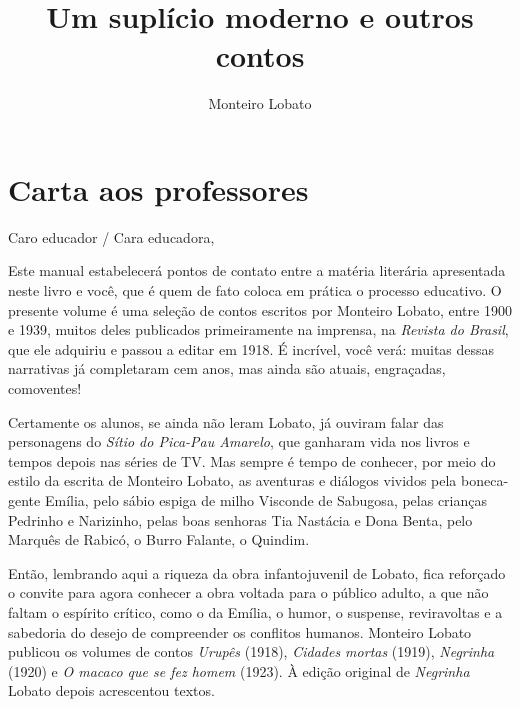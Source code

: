 \documentclass{article}
\begin{document}
\newcommand{\AutorLivro}{Monteiro Lobato}
\newcommand{\TituloLivro}{Um suplício moderno e outros contos}
\newcommand{\Tema}{Ficção, mistério e fantasia}
\newcommand{\Genero}{Conto, crônica e novela}
\newcommand{\issnppub}{---}
\newcommand{\issnepub}{---}
\newcommand{\colaborador}{\textbf{Fulano de Tal} é uma pessoa incrível e vai fazer um bom serviço.}


\title{\TituloLivro}
\author{\AutorLivro}
\def\authornotes{\colaborador}

\date{}
\maketitle
\tableofcontents

\pagebreak

\section{Carta aos professores}

Caro educador / Cara educadora,\\\bigskip

\reversemarginpar
\marginparwidth=5cm

Este manual estabelecerá pontos de contato entre a matéria literária
apresentada neste livro e você, que é quem de fato coloca em prática o
processo educativo. O presente volume é uma seleção de contos escritos
por Monteiro Lobato, entre 1900 e 1939, muitos deles publicados
primeiramente na imprensa, na \emph{Revista do Brasil}, que ele adquiriu
e passou a editar em 1918. É incrível, você verá: muitas dessas
narrativas já completaram cem anos, mas ainda são atuais, engraçadas,
comoventes!

Certamente os alunos, se ainda não leram Lobato, já ouviram falar das
personagens do \emph{Sítio do Pica-Pau Amarelo}, que ganharam vida nos
livros e tempos depois nas séries de TV. Mas sempre é tempo de conhecer,
por meio do estilo da escrita de Monteiro Lobato, as aventuras e
diálogos vividos pela boneca-gente Emília, pelo sábio espiga de milho
Visconde de Sabugosa, pelas crianças Pedrinho e Narizinho, pelas boas
senhoras Tia Nastácia e Dona Benta, pelo Marquês de Rabicó, o Burro
Falante, o Quindim.

Então, lembrando aqui a riqueza da obra infantojuvenil de Lobato, fica
reforçado o convite para agora conhecer a obra voltada para o público
adulto, a que não faltam o espírito crítico, como o da Emília, o humor,
o suspense, reviravoltas e a sabedoria do desejo de compreender os
conflitos humanos. Monteiro Lobato publicou os volumes de contos
\emph{Urupês} (1918), \emph{Cidades mortas} (1919), \emph{Negrinha}
(1920) e \emph{O macaco que se fez homem} (1923). À edição original de
\emph{Negrinha} Lobato depois acrescentou textos.
\end{document}
